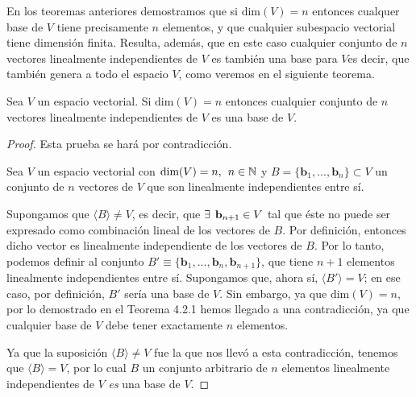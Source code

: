 \documentclass[12pt,dvipsnames]{article}
\newenvironment{teorema}[2][Teorema]{\begin{trivlist}
\item[\hskip \labelsep {\bfseries #1}\hskip \labelsep {\bfseries #2.}]}{\end{trivlist}}
\begin{document}
En los teoremas anteriores demostramos que si $\text{dim}(V)=n$ entonces cualquer base de $V$ tiene precisamente $n$ elementos, y que cualquier subespacio vectorial tiene dimensión finita. Resulta, además, que en este caso cualquier conjunto de $n$ vectores linealmente independientes de $V$ es también una base para $V$\textemdash es decir, que también genera a todo el espacio $V$, como veremos en el siguiente teorema. 

\begin{teorema} {4.2.3}

    Sea $V$ un espacio vectorial. Si $\text{dim}(V)=n$ entonces cualquier conjunto de $n$ vectores linealmente independientes de $V$ es una base de $V$.

\begin{proof}

    Esta prueba se hará por contradicción. 

    Sea $V$ un espacio vectorial con $\text{dim}(V)=n, \hspace{1.5mm} n\in\mathbb{N}$ y $B=\{\mathbf{b}_1, ..., \mathbf{b}_n\}\subset V$ un conjunto de $n$ vectores de $V$ que son linealmente independientes entre sí.

    Supongamos que $\langle B \rangle \neq V$, es decir, que $\exists\hspace{1.5mm} \mathbf{b}_{n+1}\in V$ tal que éste no puede ser expresado como combinación lineal de los vectores de $B$. Por definición, entonces dicho vector es linealmente independiente de los vectores de $B$. Por lo tanto, podemos definir al conjunto $B'\equiv\{\mathbf{b}_1, ...,\mathbf{b}_n, \mathbf{b}_{n+1}\}$, que tiene $n+1$ elementos linealmente independientes entre sí. Supongamos que, ahora sí, $\langle B' \rangle = V$; en ese caso, por definición, $B'$ sería una base de $V$. Sin embargo, ya que $\text{dim}(V)=n$, por lo demostrado en el Teorema 4.2.1 hemos llegado a una contradicción, ya que cualquier base de $V$ debe tener exactamente $n$ elementos.
    
    Ya que la suposición $\langle B \rangle \neq V$ fue la que nos llevó a esta contradicción, tenemos que $\langle B \rangle = V$, por lo cual $B$ \textemdash un conjunto arbitrario de $n$ elementos linealmente independientes de $V$\textemdash \hspace{1mm} \emph{es} una base de $V$.

\end{proof}

\end{teorema}
\end{document}
